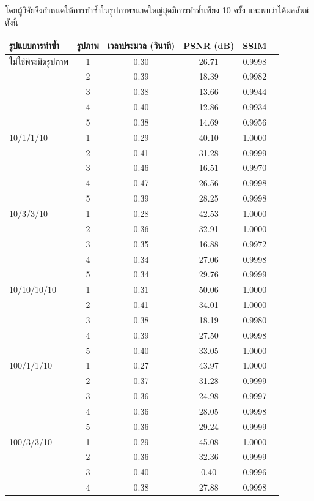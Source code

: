 \documentclass[hidelinks, a4paper,12pt]{article}
\numberwithin{equation}{section}							%
\numberwithin{equation}{section}
\begin{document}
{	 โดยผู้วิจัยจึงกำหนดให้การทำซ้ำในรูปภาพขนาดใหญ่สุดมีการทำซ้ำเพียง 10 ครั้ง และพบว่าได้ผลลัพธ์ดังนี้
		\begin{table}[H]
		\centering
		\small
		\begin{tabular}[ht]{|l|c|c|c|c|c|}
			\hline
			รูปแบบการทำซ้ำ  & รูปภาพ &เวลาประมวล  (วินาที) & PSNR (dB) & SSIM \\
			\hline
			ไม่ใช้พีระมิดรูปภาพ & 1 & 0.30  & 26.71  & 0.9998 \\ 
			& 2 & 0.39  & 18.39  & 0.9982 \\
			& 3 & 0.38 & 13.66  & 0.9944 \\
			& 4 & 0.40  & 12.86 & 0.9934 \\
			& 5 & 0.38 & 14.69 &  0.9956\\
			\hline
			10/1/1/10 & 1 & 0.29 & 40.10 & 1.0000\\
			& 2 & 0.41 & 31.28 & 0.9999 \\
			& 3 & 0.46 & 16.51 & 0.9970 \\
			& 4 & 0.47 & 26.56 & 0.9998\\
			& 5 & 0.39 & 28.25 & 0.9998 \\
			\hline
			10/3/3/10  & 1 & 0.28 & 42.53 & 1.0000\\
			& 2 & 0.36 & 32.91 & 1.0000 \\
			& 3 & 0.35 & 16.88 & 0.9972 \\
			& 4 & 0.34 & 27.06 &  0.9998 \\
			& 5 & 0.34 & 29.76 & 0.9999 \\
			\hline
			10/10/10/10  & 1 & 0.31 & 50.06 & 1.0000 \\
			& 2 & 0.41 & 34.01 & 1.0000\\
			& 3 & 0.38 & 18.19 & 0.9980\\
			& 4 & 0.39 & 27.50 & 0.9998\\
			& 5 & 0.40 & 33.05 &  1.0000\\
			\hline
			100/1/1/10  & 1 & 0.27 & 43.97 & 1.0000 \\
			& 2 & 0.37  & 31.28 & 0.9999\\
			& 3 & 0.36 & 24.98 & 0.9997\\
			& 4 & 0.36  &28.05 & 0.9998\\
			& 5 & 0.36 & 29.24 & 0.9999 \\
			\hline
			100/3/3/10  & 1 & 0.29 & 45.08& 1.0000 \\
			& 2 & 0.36 & 32.36 & 0.9999\\
			& 3 & 0.40 & 0.40 & 0.9996\\
			& 4 & 0.38 & 27.88 & 0.9998\\

\end{tabular}
\end{table}}
\end{document}
